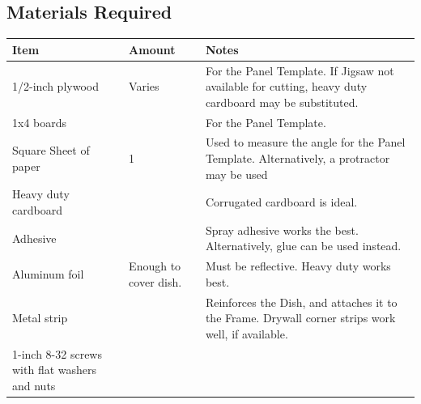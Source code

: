 \documentclass{article}
\begin{document}
        \subsection{Materials Required}
            \begin{table}[h]
                \begin{tabular}{|p{3cm}|p{3cm}|p{11cm}|}
                \hline
                \rowcolor[HTML]{C0C0C0} 
                Item                                                        & Amount                & Notes                                                                                                                \\ \hline
                1/2-inch plywood                                            & Varies                & For the Panel Template.  If Jigsaw not available for cutting, heavy duty cardboard may be substituted.               \\ \hline
                1x4 boards                                                  &                       & For the Panel Template.                                                                                              \\ \hline
                Square Sheet of paper                                       & 1                     & Used to measure the angle for the Panel Template.  Alternatively, a protractor may be used                           \\ \hline
                Heavy duty cardboard                                        &                       & Corrugated cardboard is ideal.                                                                                       \\ \hline
                Adhesive                                                    &                       & Spray adhesive works the best.  Alternatively, glue can be used instead.                                             \\ \hline
                Aluminum foil                                               & Enough to cover dish. & Must be reflective.  Heavy duty works best.                                                                          \\ \hline
                Metal strip                                                 &                       & Reinforces the Dish, and attaches it to the Frame.  Drywall corner strips work well, if available.                   \\ \hline
                1-inch 8-32 screws with flat washers and nuts               &                       &                                                                                                                      \\ \hline

\end{tabular}
\end{table}
\end{document}
